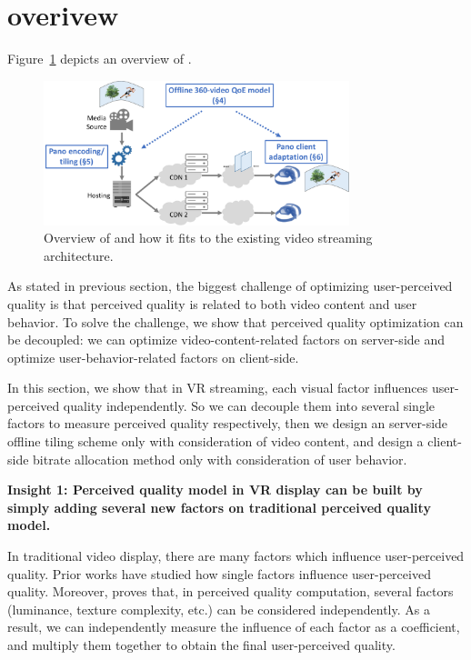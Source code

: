 
\section{\name overivew}



Figure~\ref{fig:overview} depicts an overview of \name. 

\begin{figure}[t!]
  \centering
  \includegraphics[width=3.5in]{figures/overview.pdf}
  \caption{Overview of \name and how it fits to the existing \vr video streaming architecture.}
  \label{fig:overview}
  \end{figure}


As stated in previous section, the biggest challenge of optimizing user-perceived quality is that perceived quality is related to both video content and user behavior. To solve the challenge, we show that perceived quality optimization can be decoupled: we can optimize video-content-related factors on server-side and optimize user-behavior-related factors on client-side.

In this section, we show that in VR streaming, each visual factor influences user-perceived quality independently. So we can decouple them into several single factors to measure perceived quality respectively, then we design an server-side offline tiling scheme only with consideration of video content, and design a client-side bitrate allocation method only with consideration of user behavior.

\textbf{Insight 1: Perceived quality model in VR display can be built by simply adding several new factors on traditional perceived quality model.}

In traditional video display, there are many factors which influence user-perceived quality. Prior works have studied how single factors influence user-perceived quality. Moreover, \cite{distance} proves that, in perceived quality computation, several factors (luminance, texture complexity, etc.) can be considered independently. As a result, we can independently measure the influence of each factor as a coefficient, and multiply them together to obtain the final user-perceived quality.


